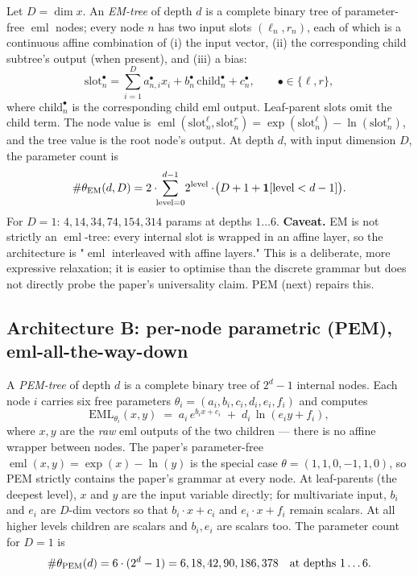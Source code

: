 \documentclass[11pt]{article}
\newcommand{\eml}{\operatorname{eml}}
\begin{document}
Let $D = \dim x$. An \emph{EM-tree} of depth $d$ is a complete binary tree
of parameter-free $\eml$ nodes; every node $n$ has two input slots
$(\ell_n, r_n)$, each of which is a continuous affine combination of (i) the
input vector, (ii) the corresponding child subtree's output (when present),
and (iii) a bias:
\begin{equation}
\text{slot}_n^{\bullet} = \sum_{i=1}^{D} a_{n,i}^{\bullet} x_i
                          + b_n^{\bullet}\, \text{child}_n^{\bullet}
                          + c_n^{\bullet}, \qquad \bullet \in \{\ell, r\},
\label{eq:slot}
\end{equation}
where $\text{child}_n^{\bullet}$ is the corresponding child eml output.
Leaf-parent slots omit the child term. The node value is
$\eml(\text{slot}_n^{\ell}, \text{slot}_n^{r}) = \exp(\text{slot}_n^{\ell})
- \ln(\text{slot}_n^{r})$, and the tree value is the root node's output.
At depth $d$, with input dimension $D$, the parameter count is
\[
\#\theta_{\rm EM}(d, D) = 2 \cdot \!\!\sum_{\text{level}=0}^{d-1}\! 2^{\text{level}}
  \cdot \!\big(D + 1 + \mathbf{1}[\text{level} < d-1]\big).
\]
For $D = 1$: $4, 14, 34, 74, 154, 314$ params at depths $1\ldots 6$.
\textbf{Caveat.} EM is not strictly an $\eml$-tree: every internal slot is
wrapped in an affine layer, so the architecture is "$\eml$ interleaved with
affine layers." This is a deliberate, more expressive relaxation; it is
easier to optimise than the discrete grammar but does not directly probe
the paper's universality claim. PEM (next) repairs this.

\subsection{Architecture B: per-node parametric (PEM), eml-all-the-way-down}
\label{sec:cae:pem}

A \emph{PEM-tree} of depth $d$ is a complete binary tree of $2^d - 1$
internal nodes. Each node $i$ carries six free parameters
$\theta_i = (a_i, b_i, c_i, d_i, e_i, f_i)$ and computes
\begin{equation}
\mathrm{EML}_{\theta_i}(x, y) \;=\; a_i\, e^{b_i x + c_i} \;+\; d_i\,
  \ln(e_i y + f_i),
\label{eq:pem}
\end{equation}
where $x, y$ are the \emph{raw} eml outputs of the two children — there is
no affine wrapper between nodes. The paper's parameter-free
$\eml(x,y) = \exp(x) - \ln(y)$ is the special case
$\theta = (1, 1, 0, -1, 1, 0)$, so PEM strictly contains the paper's
grammar at every node. At leaf-parents (the deepest level), $x$ and $y$
are the input variable directly; for multivariate input, $b_i$ and $e_i$
are $D$-dim vectors so that $b_i \cdot x + c_i$ and $e_i \cdot x + f_i$
remain scalars. At all higher levels children are scalars and $b_i, e_i$
are scalars too. The parameter count for $D = 1$ is
\[
\#\theta_{\rm PEM}(d) = 6 \cdot (2^d - 1) = 6, 18, 42, 90, 186, 378
\quad \text{at depths $1\ldots 6$.}
\]
\end{document}

